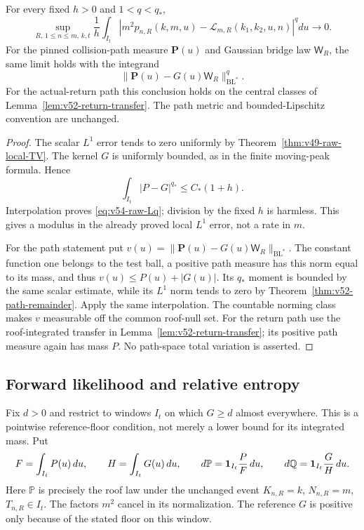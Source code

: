 \begin{theorem}
\label{thm:v54-raw-Lq}
For every fixed $h>0$ and $1<q<q_*$,
\begin{equation}\label{eq:v54-raw-Lq}
 \sup_{R,\,1\le n\le m,\,k,t}\frac1h\int_{I_t}
  \left|m^2p_{n,R}(k,m,u)-\mathcal L_{m,R}(k_1,k_2,u,n)\right|^qdu
                         \longrightarrow0.
\end{equation}
For the pinned collision-path measure $\mathbf P(u)$ and Gaussian
bridge law $\mathsf W_R$, the same limit holds with the integrand
\begin{equation}\label{eq:v54-path-Lq}
 \|\mathbf P(u)-G(u)\mathsf W_R\|_{\mathrm{BL}^*}^{q}.
\end{equation}
For the actual-return path this conclusion holds on the central
classes of Lemma~\ref{lem:v52-return-transfer}. The path metric and
bounded-Lipschitz convention are unchanged.
\end{theorem}
\begin{proof}
The scalar $L^1$ error tends to zero uniformly by
Theorem~\ref{thm:v49-raw-local-TV}. The kernel $G$ is uniformly
bounded, as in the finite moving-peak formula. Hence
\[
 \int_{I_t}|P-G|^{q_*}\le C_*(1+h).
\]
Interpolation proves \eqref{eq:v54-raw-Lq}; division by the fixed
$h$ is harmless. This gives a modulus in the already proved local
$L^1$ error, not a rate in $m$.

For the path statement put
$v(u)=\|\mathbf P(u)-G(u)\mathsf W_R\|_{\mathrm{BL}^*}$.
The constant function one belongs to the test ball, a positive
path measure has this norm equal to its mass, and thus
$v(u)\le P(u)+|G(u)|$. Its $q_*$ moment is bounded by the same
scalar estimate, while its $L^1$ norm tends to zero by
Theorem~\ref{thm:v52-path-remainder}. Apply the same interpolation.
The countable norming class makes $v$ measurable off the common
roof-null set. For the return path use the roof-integrated transfer
in Lemma~\ref{lem:v52-return-transfer}; its positive path measure
again has mass $P$. No path-space total variation is asserted.
\end{proof}

\subsection{Forward likelihood and relative entropy}
Fix $d>0$ and restrict to windows $I_t$ on which $G\ge d$ almost
everywhere. This is a pointwise reference-floor condition, not merely
a lower bound for its integrated mass. Put
\[
 F=\int_{I_t}P(u)\,du,\qquad H=\int_{I_t}G(u)\,du,
 \qquad d\mathbb P=\mathbf1_{I_t}\frac{P}{F}\,du,
 \qquad d\mathbb Q=\mathbf1_{I_t}\frac{G}{H}\,du.
\]
Here $\mathbb P$ is precisely the roof law under the unchanged event
$K_{n,R}=k$, $N_{n,R}=m$, $T_{n,R}\in I_t$.
The factors $m^2$ cancel in its normalization. The reference $G$ is
positive only because of the stated floor on this window.

